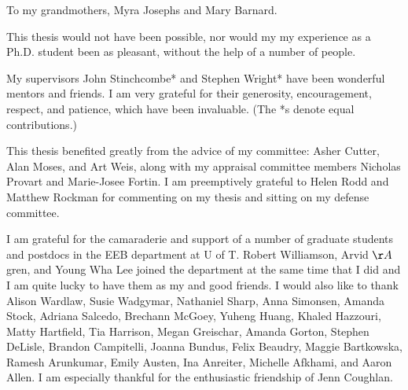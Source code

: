 \documentclass{ut-thesis}
\begin{document}
\begin{preliminary}
\begin{dedication}
To my grandmothers, Myra Josephs and Mary Barnard.
\end{dedication}

\newpage  %


\begin{acknowledgements}
\setlength{\parindent}{0ex}
\setlength{\parskip}{1ex}

This thesis would not have been possible, nor would my my experience as a Ph.D. student been as pleasant, without the help of a number of people.

My supervisors John Stinchcombe* and Stephen Wright* have been wonderful mentors and friends. I am very grateful for their generosity, encouragement, respect, and patience, which have been invaluable. (The *s denote equal contributions.)

This thesis benefited greatly from the advice of my committee: Asher Cutter, Alan Moses, and Art Weis, along with my appraisal committee members Nicholas Provart and Marie-Josee Fortin. I am preemptively grateful to Helen Rodd and Matthew Rockman for commenting on my thesis and sitting on my defense committee.

I am grateful for the camaraderie and support of a number of graduate students and postdocs in the EEB department at U of T. Robert Williamson, Arvid $\AA$gren, and Young Wha Lee joined the department at the same time that I did and I am quite lucky to have them as my  and good friends. I would also like to thank Alison Wardlaw, Susie Wadgymar, Nathaniel Sharp, Anna Simonsen, Amanda Stock, Adriana Salcedo, Brechann McGoey, Yuheng Huang, Khaled Hazzouri, Matty Hartfield, Tia Harrison, Megan Greischar, Amanda Gorton, Stephen DeLisle, Brandon Campitelli, Joanna Bundus, Felix Beaudry, Maggie Bartkowska, Ramesh Arunkumar, Emily Austen, Ina Anreiter, Michelle Afkhami, and Aaron Allen. I am especially thankful for the enthusiastic friendship of Jenn Coughlan.


\end{acknowledgements}
\end{preliminary}
\end{document}
